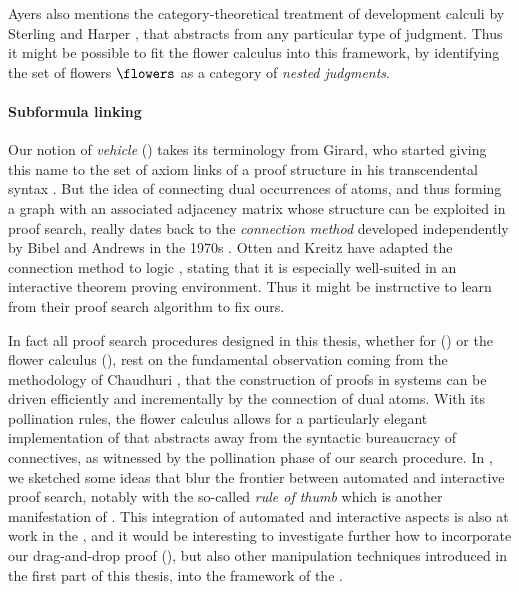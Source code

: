 Ayers also mentions the category-theoretical treatment of development calculi by
Sterling and Harper , that abstracts from any
particular type of judgment. Thus it might be possible to fit the flower
calculus into this framework, by identifying the set of flowers $\flowers$ as a
category of \emph{nested judgments}.

\paragraph{Subformula linking}

Our notion of \emph{vehicle} () takes its terminology from
Girard, who started giving this name to the set of axiom links of a proof
structure in his transcendental syntax . But the idea of connecting dual
occurrences of atoms, and thus forming a graph with an associated adjacency
matrix whose structure can be exploited in proof search, really dates back to
the \emph{connection method} developed independently by Bibel and Andrews in the
1970s . Otten and Kreitz have adapted the connection method
to  logic , stating that it is
especially well-suited in an interactive theorem proving environment. Thus it
might be instructive to learn from their proof search algorithm to fix ours.

In fact all proof search procedures designed in this thesis, whether for  () or the flower calculus
(), rest on the fundamental observation coming from the
 methodology of Chaudhuri , that the
construction of proofs in  systems can be driven efficiently and
incrementally by the connection of dual atoms. With its pollination rules, the
flower calculus allows for a particularly elegant implementation of  that abstracts away from the syntactic bureaucracy of 
connectives, as witnessed by the pollination phase of our search procedure. In
, we sketched some ideas that blur the frontier
between automated and interactive proof search, notably with the so-called
\emph{rule of thumb} which is another manifestation of . This
integration of automated and interactive aspects is also at work in the , and it would be interesting to investigate further how to incorporate
our drag-and-drop proof  (), but also other 
manipulation techniques introduced in the first part of this thesis, into the
 framework of the .


